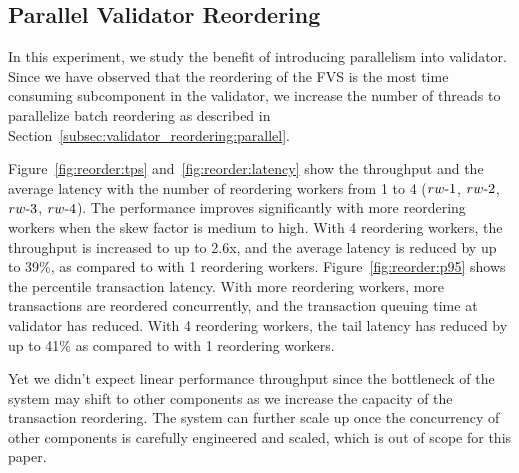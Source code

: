 \subsection{Parallel Validator Reordering}
In this experiment, we study the benefit of introducing parallelism into validator. Since we have observed that the reordering of the FVS is the most time consuming subcomponent in the validator, we increase the number of threads to parallelize batch reordering as described in Section~\ref{subsec:validator_reordering:parallel}. 

Figure~\ref{fig:reorder:tps} and~\ref{fig:reorder:latency} show the throughput
and the average latency with the number of reordering workers from 1 to 4
($rw\hbox{-}1$, $rw\hbox{-}2$, $rw\hbox{-}3$, $rw\hbox{-}4$). The performance improves significantly with more reordering workers when the skew factor is medium to high. With 4 reordering workers, the throughput is increased to up to 2.6x, and the average latency is reduced by up to 39\%, as compared to with 1 reordering workers. Figure~\ref{fig:reorder:p95} shows the percentile transaction latency. With more reordering workers, more transactions are reordered concurrently, and the transaction queuing time at validator has reduced. With 4 reordering workers, the tail latency has reduced by up to 41\% as compared to with 1 reordering workers. 

Yet we didn't expect linear performance throughput since the bottleneck of the system may shift to other
components as we increase the capacity of the transaction reordering. The system can further scale up once the concurrency
of other components is carefully engineered and scaled,
which is out of scope for this paper.
